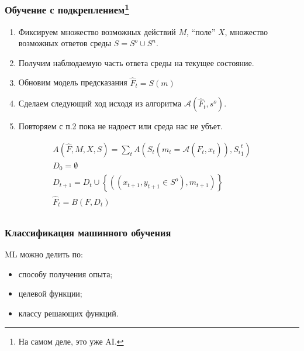 \documentclass[14pt, fleqn, xcolor={dvipsnames, table}]{beamer}
\begin{document}
\begin{frame}
\frametitle{Обучение с подкреплением\footnote{На самом деле, это уже AI.}}
\footnotesize
\begin{enumerate}
	\item Фиксируем множество возможных действий $M$, ``поле'' $X$, множество возможных ответов среды $S = S^o \cup S^n$.
	\item Получим наблюдаемую часть ответа среды на текущее состояние.
	\item Обновим модель предсказания $\hat{F}_t = S(m)$
	\item Сделаем следующий ход исходя из алгоритма $\mathcal{A}(\hat{F}_t, s^o)$.
	\item Повторяем с п.2 пока не надоест или среда нас не убъет.
\end{enumerate}
$$\begin{array}{l}
A(\hat{F}, M, X, S) = \sum_t A(S_t(m_t = \mathcal{A}(\hat{F}_t, x_t)), {S_i}_1^t) \\
D_0 = \emptyset \\
D_{t+1} = D_{t} \cup \left\{\left((x_{t+1}, y_{t+1} \in S^o), m_{t+1}\right)\right\} \\
\hat{F}_t = B(F, D_t) \\
\end{array}$$
\end{frame}

\begin{frame}
\frametitle{Классификация машинного обучения}
ML можно делить по:
\begin{itemize}
	\item способу получения опыта;
	\item { целевой функции;}
	\item классу решающих функций.
\end{itemize}
\end{frame}
\end{document}
